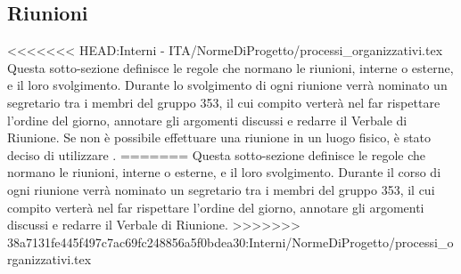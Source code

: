 \documentclass[NormeDiProgetto.tex]{subfiles}
\begin{document}
	\subsection{Riunioni}
<<<<<<< HEAD:Interni - ITA/NormeDiProgetto/processi_organizzativi.tex
	Questa sotto-sezione definisce le regole che normano le riunioni, interne o esterne, e il loro svolgimento. Durante lo svolgimento di ogni riunione verrà nominato un segretario tra i membri del gruppo 353, il cui compito verterà nel far rispettare l'ordine del giorno, annotare gli argomenti discussi e redarre il Verbale di Riunione.
	Se non è possibile effettuare una riunione in un luogo fisico, è stato deciso di utilizzare .
=======
	Questa sotto-sezione definisce le regole che normano le riunioni, interne o esterne, e il loro svolgimento. Durante il corso di ogni riunione verrà nominato un segretario tra i membri del gruppo 353, il cui compito verterà nel far rispettare l'ordine del giorno, annotare gli argomenti discussi e redarre il Verbale di Riunione.
>>>>>>> 38a7131fe445f497c7ac69fc248856a5f0bdea30:Interni/NormeDiProgetto/processi_organizzativi.tex
\end{document}
